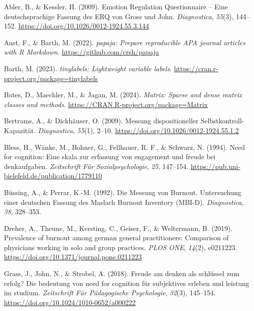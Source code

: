 \documentclass[
  man]{apa6}
\newlength{\cslhangindent}
\newenvironment{CSLReferences}[2] %
 {\begin{list}{}{%
  \setlength{\itemindent}{0pt}
  \setlength{\leftmargin}{0pt}
  \setlength{\parsep}{0pt}
  \ifodd #1
   \setlength{\leftmargin}{\cslhangindent}
   \setlength{\itemindent}{-1\cslhangindent}
  \fi
  \setlength{\itemsep}{#2\baselineskip}}}
 {\end{list}}
\begin{document}
\label{refs}
\begin{CSLReferences}{1}{0}
Abler, B., \& Kessler, H. (2009). {Emotion Regulation Questionnaire -- Eine deutschsprachige Fassung des ERQ von Gross und John}. \emph{Diagnostica}, \emph{55}(3), 144--152. \url{https://doi.org/10.1026/0012-1924.55.3.144}

Aust, F., \& Barth, M. (2022). \emph{{papaja}: {Prepare} reproducible {APA} journal articles with {R Markdown}}. \url{https://github.com/crsh/papaja}

Barth, M. (2023). \emph{{tinylabels}: Lightweight variable labels}. \url{https://cran.r-project.org/package=tinylabels}

Bates, D., Maechler, M., \& Jagan, M. (2024). \emph{Matrix: Sparse and dense matrix classes and methods}. \url{https://CRAN.R-project.org/package=Matrix}

Bertrams, A., \& Dickhäuser, O. (2009). {Messung dispositioneller Selbstkontroll-Kapazität}. \emph{Diagnostica}, \emph{55}(1), 2--10. \url{https://doi.org/10.1026/0012-1924.55.1.2}

Bless, H., Wänke, M., Bohner, G., Fellhauer, R. F., \& Schwarz, N. (1994). Need for cognition: Eine skala zur erfassung von engagement und freude bei denkaufgaben. \emph{Zeitschrift Für Sozialpsychologie}, \emph{25}, 147--154. \url{https://pub.uni-bielefeld.de/publication/1779110}

Büssing, A., \& Perrar, K.-M. (1992). Die {Messung von Burnout. Untersuchung einer deutschen Fassung des Maslach Burnout Inventory (MBI-D)}. \emph{Diagnostica}, \emph{38}, 328--353.

Dreher, A., Theune, M., Kersting, C., Geiser, F., \& Weltermann, B. (2019). Prevalence of burnout among german general practitioners: Comparison of physicians working in solo and group practices. \emph{PLOS ONE}, \emph{14}(2), e0211223. \url{https://doi.org/10.1371/journal.pone.0211223}

Grass, J., John, N., \& Strobel, A. (2018). Freude am denken als schlüssel zum erfolg? Die bedeutung von need for cognition für subjektives erleben und leistung im studium. \emph{Zeitschrift Für Pädagogische Psychologie}, \emph{32}(3), 145--154. \url{https://doi.org/10.1024/1010-0652/a000222}


\end{CSLReferences}
\end{document}
